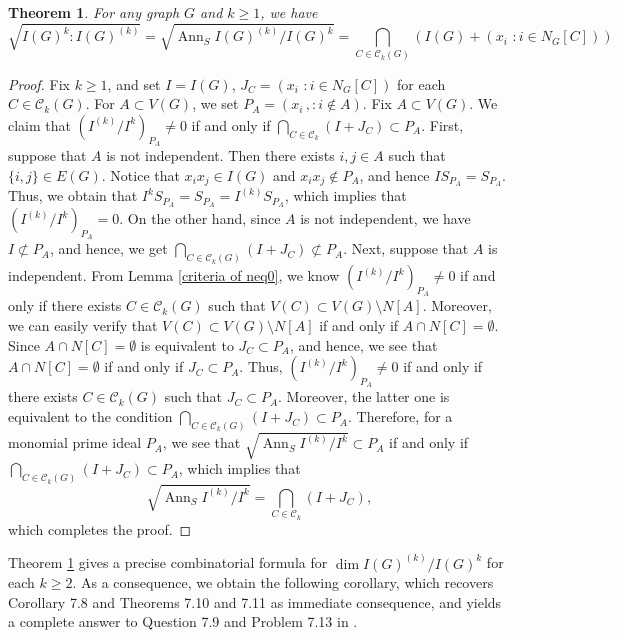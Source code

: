 \documentclass[12pt]{amsart}
\newtheorem{thm}{Theorem}[section]
\theoremstyle{definition}
\theoremstyle{remark}
\DeclareMathOperator{\Ann}{Ann}
\begin{document}
\begin{thm}\label{locus}
For any graph $G$ and $k\geq1$, we have 
$$\sqrt{I(G)^{k}:I(G)^{(k)}}=\sqrt{\Ann_{S}I(G)^{(k)}/I(G)^{k}}=\bigcap_{C\in\mathcal{C}_{k}(G)}(I(G)+(x_{i}\,\,: i\in N_{G}[C]))$$
\end{thm}
\begin{proof}
Fix $k\geq1$, and set $I=I(G)$, $J_{C}=(x_{i}\,\,: i\in N_{G}[C])$ for each $C\in\mathcal{C}_{k}(G)$. For $A\subset V(G)$, we set $P_{A}=(x_{i}\,,: i\notin A)$. Fix $A\subset V(G)$. We claim that $(I^{(k)}/I^{k})_{P_{A}}\neq0$ if and only if $\bigcap_{C\in\mathcal{C}_{k}}(I+J_{C})\subset P_{A}$. First, suppose that $A$ is not independent. Then there exists $i,j\in A$ such that $\{i,j\}\in E(G)$. Notice that $x_{i}x_{j}\in I(G)$ and $x_{i}x_{j}\notin P_{A}$, and hence $IS_{P_{A}}=S_{P_{A}}$. Thus, we obtain that $I^{k}S_{P_{A}}=S_{P_{A}}=I^{(k)}S_{P_{A}}$, which implies that $(I^{(k)}/I^{k})_{P_{A}}=0$. On the other hand, since $A$ is not independent, we have $I\not\subset P_{A}$, and hence, we get $\bigcap_{C\in\mathcal{C}_{k}(G)}(I+J_{C})\not\subset P_{A}$. Next, suppose that $A$ is independent. From Lemma \ref{criteria of neq0}, we know $(I^{(k)}/I^{k})_{P_{A}}\neq0$ if and only if there exists $C\in\mathcal{C}_{k}(G)$ such that $V(C)\subset V(G)\setminus N[A]$. Moreover, we can easily verify that $V(C)\subset V(G)\setminus N[A]$ if and only if $A\cap N[C]=\emptyset$. Since $A\cap N[C]=\emptyset$ is equivalent to $J_{C}\subset P_{A}$, and hence, we see that $A\cap N[C]=\emptyset$ if and only if $J_{C}\subset P_{A}$. Thus, $(I^{(k)}/I^{k})_{P_{A}}\neq0$ if and only if there exists $C\in\mathcal{C}_{k}(G)$ such that $J_{C}\subset P_{A}$. Moreover, the latter one is equivalent to the condition $\bigcap_{C\in\mathcal{C}_{k}(G)}(I+J_{C})\subset P_{A}$. Therefore, for a monomial prime ideal $P_{A}$, we see that $\sqrt{\Ann_{S}I^{(k)}/I^{k}}\subset P_{A}$ if and only if $\bigcap_{C\in\mathcal{C}_{k}(G)}(I+J_{C})\subset P_{A}$, which implies that $$\sqrt{\Ann_{S}I^{(k)}/I^{k}}=\bigcap_{C\in\mathcal{C}_{k}}(I+J_{C}),$$which completes the proof.  
\end{proof}

Theorem \ref{locus} gives a precise combinatorial formula for $\dim I(G)^{(k)}/I(G)^{k}$ for each $k\geq2$. As a consequence, we obtain the following corollary, which recovers Corollary 7.8 and Theorems 7.10 and 7.11 as immediate consequence, and yields a complete answer to Question 7.9 and Problem 7.13 in \cite{hm2026}. 
\end{document}
